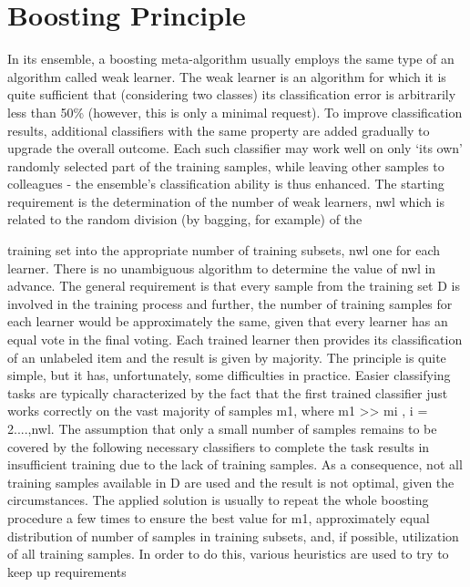 \documentclass[11pt,openany,executivepaper]{book}
\begin{document}
\section{Boosting Principle}

In its ensemble, a boosting meta-algorithm usually employs the same type of an
algorithm called weak learner. The weak learner is an algorithm for which it is
quite sufficient that (considering two classes) its classification error is arbitrarily
less than 50\% (however, this is only a minimal request).
To improve classification results, additional classifiers with the same property
are added gradually to upgrade the overall outcome. Each such classifier may
work well on only ‘its own’ randomly selected part of the training samples, while
leaving other samples to colleagues - the ensemble’s classification ability is thus
enhanced.
The starting requirement is the determination of the number of weak learners,
nwl which is related to the random division (by bagging, for example) of the

training set into the appropriate number of training subsets, nwl one for each
learner.
There is no unambiguous algorithm to determine the value of nwl in advance. The general requirement is that every sample from the training set D is
involved in the training process and further, the number of training samples for
each learner would be approximately the same, given that every learner has an
equal vote in the final voting. Each trained learner then provides its classification
of an unlabeled item and the result is given by majority.
The principle is quite simple, but it has, unfortunately, some difficulties in
practice. Easier classifying tasks are typically characterized by the fact that the
first trained classifier just works correctly on the vast majority of samples m1,
where m1 >> mi
, i = 2....,nwl. The assumption that only a small number of
samples remains to be covered by the following necessary classifiers to complete
the task results in insufficient training due to the lack of training samples. As a
consequence, not all training samples available in D are used and the result is not
optimal, given the circumstances.
The applied solution is usually to repeat the whole boosting procedure a few
times to ensure the best value for m1, approximately equal distribution of number
of samples in training subsets, and, if possible, utilization of all training samples.
In order to do this, various heuristics are used to try to keep up requirements
\end{document}
